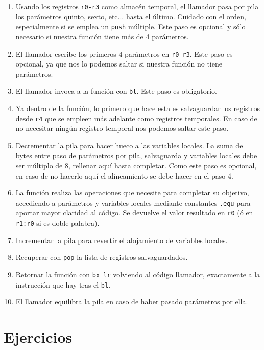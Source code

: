 \begin{enumerate}
  \item Usando los registros {\tt r0-r3} como almacén temporal, el llamador pasa por pila
        los parámetros quinto, sexto, etc... hasta el último. Cuidado con el orden,
        especialmente si se emplea un {\tt push} múltiple. Este paso es opcional y sólo
        necesario si nuestra función tiene más de 4 parámetros.
  \item El llamador escribe los primeros 4 parámetros en {\tt r0-r3}. Este paso es opcional,
        ya que nos lo podemos saltar si nuestra función no tiene parámetros.
  \item El llamador invoca a la función con {\tt bl}. Este paso es obligatorio.
  \item Ya dentro de la función, lo primero que hace esta es salvaguardar los registros
        desde {\tt r4} que se empleen más adelante como registros temporales. En
        caso de no necesitar ningún registro temporal nos podemos saltar este paso.
  \item Decrementar la pila para hacer hueco a las variables locales. La suma de bytes
        entre paso de parámetros por pila, salvaguarda y variables locales debe ser
        múltiplo de 8, rellenar aquí hasta completar. Como este paso es opcional, en caso
        de no hacerlo aquí el alineamiento se debe hacer en el paso 4.
  \item La función realiza las operaciones que necesite para completar su objetivo, accediendo
        a parámetros y variables locales mediante constantes {\tt .equ} para aportar mayor claridad
        al código. Se devuelve el valor resultado en {\tt r0} (ó en {\tt r1:r0} si es doble
        palabra).
  \item Incrementar la pila para revertir el alojamiento de variables locales.
  \item Recuperar con {\tt pop} la lista de registros salvaguardados.
  \item Retornar la función con {\tt bx lr} volviendo al código llamador, exactamente a la
        instrucción que hay tras el {\tt bl}. 
  \item El llamador equilibra la pila en caso de haber pasado parámetros por ella.
\end{enumerate}

\section{Ejercicios}


